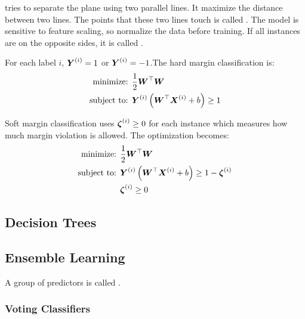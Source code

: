  tries to separate the plane using two parallel lines. It maximize the distance between two lines. The points that these two lines touch is called . The model is sensitive to feature scaling, so normalize the data before training. If all instances are on the opposite sides, it is called .


For each label $i$, $\boldsymbol{Y}^{(i)} =1$ or $\boldsymbol{Y}^{(i)} =-1$.The hard margin classification is:
\begin{equation}
    \begin{aligned}
        \text{minimize: } & \frac{1}{2} \boldsymbol{W}^\top \boldsymbol{W} \\
        \text{subject to: } & \boldsymbol{Y}^{(i)} \left( \boldsymbol{W}^\top \boldsymbol{X}^{(i)} + b \right) \geq 1
    \end{aligned}
\end{equation}

Soft margin classification uses  $\boldsymbol{\zeta}^{(i)} \geq 0$ for each instance which measures how much margin violation is allowed. The optimization becomes:
\begin{equation}
    \begin{aligned}
        \text{minimize: } & \frac{1}{2} \boldsymbol{W}^\top \boldsymbol{W} \\
        \text{subject to: } & \boldsymbol{Y}^{(i)} \left( \boldsymbol{W}^\top \boldsymbol{X}^{(i)} + b \right) \geq 1 - \boldsymbol{\zeta}^{(i)} \\
        & \boldsymbol{\zeta}^{(i)} \geq 0
    \end{aligned}
\end{equation}


\subsection{Decision Trees}

\subsection{Ensemble Learning}

A group of predictors is called .

\subsubsection{Voting Classifiers}

